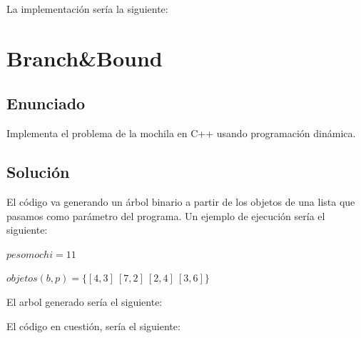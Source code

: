 \documentclass[10pt,a4paper,spanish]{report}
\begin{document}
La implementación sería la siguiente:


\chapter{\textcolor[rgb]{1.0, 0.13, 0.32}Branch\&Bound}
\section{\textcolor[rgb]{0.13, 0.67, 0.8}Enunciado}
{\Large Implementa el problema de la mochila en C++ usando programación dinámica.}

\section{\textcolor[rgb]{1, 0.44, 0.37}Solución}
El código va generando un árbol binario a partir de los objetos de una lista que pasamos como parámetro del programa. Un ejemplo de ejecución sería el siguiente:

$pesomochi = 11$

$objetos(b, p) = \Big\{ [4,3]~[7,2]~[2,4]~[3,6] \Big\}$

El arbol generado sería el siguiente:



El código en cuestión, sería el siguiente:

\end{document}

